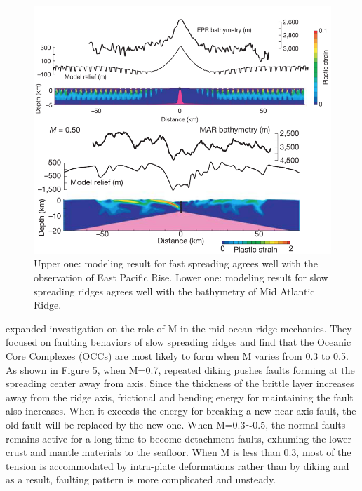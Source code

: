 \documentclass[12pt]{article}
\begin{document}

\begin{figure}[H]
 \centering
  \includegraphics[scale=0.7]{fig5_1.png}
 \caption{\small{Upper one: modeling result for fast spreading agrees well with the observation of East Pacific Rise. Lower one: modeling result for slow spreading ridges agrees well with the bathymetry of Mid Atlantic Ridge. \citep{Buck2005}}}
 \label{fig5_1}
\end{figure}
\citet{Tucholke2008} expanded investigation on the role of M in the mid-ocean ridge mechanics. They focused on faulting behaviors of slow spreading ridges and find that the Oceanic Core Complexes (OCCs) are most likely to form when M varies from 0.3 to 0.5. As shown in Figure 5, when M=0.7, repeated diking pushes faults forming at the spreading center away from axis. Since the thickness of the brittle layer increases away from the ridge axis, frictional and bending energy for maintaining the fault also increases. When it exceeds the energy for breaking a new near-axis fault, the old fault will be replaced by the new one. When M=0.3$\sim$0.5, the normal faults remains active for a long time to become detachment faults, exhuming the lower crust and mantle materials to the seafloor. When M is less than 0.3, most of the tension is accommodated by intra-plate deformations rather than by diking and as a result, faulting pattern is more complicated and unsteady.
\end{document}
